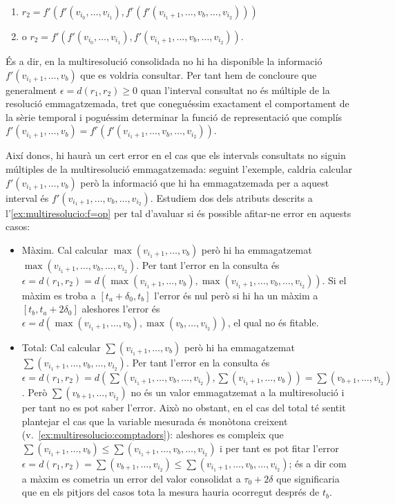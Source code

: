 \begin{example}
\begin{itemize}
\begin{enumerate}
   \item
     $r_2=f'(f'(v_{i_0},\dotsc,v_{i_1}),f^r(f'(v_{i_1+1},\dotsc,v_{b},\dotsc,v_{i_2})))$
     \item o $r_2=f'(f'(v_{i_0},\dotsc,v_{i_1}),f'(v_{i_1+1},\dotsc,v_{b},\dotsc,v_{i_2}))$.
\end{enumerate}

  És a dir, en la multiresolució consolidada no hi ha disponible la
  informació $f'(v_{i_1+1},\dotsc,v_{b})$ que es voldria consultar.
  Per tant hem de concloure que generalment $\epsilon=d(r_1,r_2)\geq
  0$ quan l'interval consultat no és múltiple de la resolució
  emmagatzemada, tret que coneguéssim exactament el comportament de la
  sèrie temporal i poguéssim determinar la funció de representació que complís 
  $ f'(v_{i_1+1},\dotsc,v_{b}) = f^r(f'(v_{i_1+1},\dotsc,v_{b},\dotsc,v_{i_2}))$.
\end{itemize}


Així doncs, hi haurà un cert error en el cas que els intervals
consultats no siguin múltiples de la multiresolució emmagatzemada:
seguint l'exemple, caldria calcular $f'(v_{i_1+1},\dotsc,v_{b})$ però
la informació que hi ha emmagatzemada per a aquest interval és
$f'(v_{i_1+1},\dotsc,v_{b},\dotsc,v_{i_2})$. Estudiem dos dels
atributs descrits a l'\autoref{ex:multiresolucio:f=op} per tal
d'avaluar si és possible afitar-ne error en aquests casos:

\begin{itemize}

\item Màxim. Cal calcular $\max(v_{i_1+1},\dotsc,v_{b})$ però hi ha
  emmagatzemat $\max(v_{i_1+1},\dotsc,v_{b},\dotsc,v_{i_2})$.  Per
  tant l'error en la consulta és $\epsilon=d(r_1,r_2)=
  d(\max(v_{i_1+1},\dotsc,v_{b}),\max(v_{i_1+1},\dotsc,v_{b},\dotsc,v_{i_2}))$. Si
  el màxim es troba a $[t_a+\delta_0,t_b]$ l'error és nul però si hi
  ha un màxim a $[t_b,t_a+2\delta_0]$ aleshores l'error és
  $\epsilon=d(\max(v_{i_1+1},\dotsc,v_{b}),\max(v_{b},\dotsc,v_{i_2}))$,
  el qual no és fitable.
  
\item Total: Cal calcular $\sum(v_{i_1+1},\dotsc,v_{b})$ però hi ha
  emmagatzemat $\sum(v_{i_1+1},\dotsc,v_{b},\dotsc,v_{i_2})$. Per tant
  l'error en la consulta és $\epsilon=d(r_1,r_2)=d(
  \sum(v_{i_1+1},\dotsc,v_{b},\dotsc,v_{i_2}),\sum(v_{i_1+1},\dotsc,v_{b}))
  = \sum(v_{b+1},\dotsc,v_{i_2})$. Però $\sum(v_{b+1},\dotsc,v_{i_2})$
  no és un valor emmagatzemat a la multiresolució i per tant no es pot
  saber l'error. Això no obstant, en el cas del total té sentit
  plantejar el cas que la variable mesurada és monòtona creixent
  (v.~\autoref{ex:multiresolucio:comptadors}): aleshores es compleix
  que $\sum(v_{i_1+1},\dotsc,v_{b}) \leq
  \sum(v_{i_1+1},\dotsc,v_{b},\dotsc,v_{i_2})$ i per tant es pot fitar
  l'error $\epsilon=d(r_1,r_2) = \sum(v_{b+1},\dotsc,v_{i_2}) \leq  
  \sum(v_{i_1+1},\dotsc,v_{b},\dotsc,v_{i_2})$; és a dir com a màxim
  es cometria un error del valor consolidat a $\tau_0+2\delta$ que
  significaria que en els pitjors del casos tota la mesura hauria
  ocorregut després de $t_b$.



\end{itemize}
\end{example}
